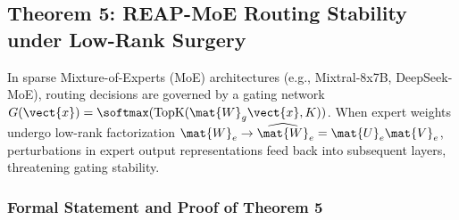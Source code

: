 \subsection{Theorem 5: REAP-MoE Routing Stability under Low-Rank Surgery}
\label{sec:thm_reap_stability}

In sparse Mixture-of-Experts (MoE) architectures (e.g., Mixtral-8x7B, DeepSeek-MoE), routing decisions are governed by a gating network $G(\vect{x}) = \softmax(\TopK(\mat{W}_g \vect{x}, K))$. When expert weights undergo low-rank factorization $\mat{W}_e \to \widehat{\mat{W}}_e = \mat{U}_e \mat{V}_e$, perturbations in expert output representations feed back into subsequent layers, threatening gating stability.

\subsubsection{Formal Statement and Proof of Theorem 5}

